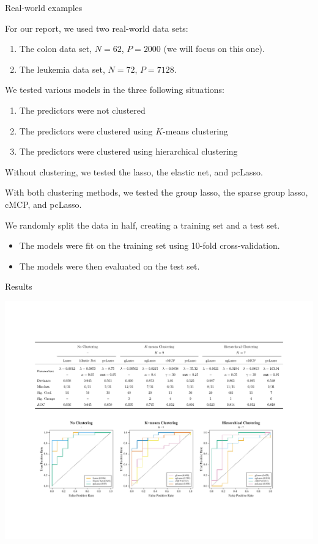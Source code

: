 \documentclass[8pt]{beamer}
\newcommand{\mys}{\vspace{0.5cm} %
}
\begin{document}
\begin{frame}{\color{white} Real-world examples}

For our report, we used two real-world data sets:
\begin{enumerate}
    \item The colon data set, $N = 62$, $P = 2000$ (we will focus on this one).
    \item The leukemia data set, $N = 72$, $P = 7128$.
\end{enumerate} \mys

We tested various models in the three following situations:
\begin{enumerate}
    \item The predictors were not clustered
    \item The predictors were clustered using $K$-means clustering
    \item The predictors were clustered using hierarchical clustering
\end{enumerate} \mys

Without clustering, we tested the lasso, the elastic net, and pcLasso. \mys

With both clustering methods, we tested the group lasso, the sparse group lasso, cMCP, and pcLasso. \mys

We randomly split the data in half, creating a training set and a test set.
\begin{itemize}
    \item The models were fit on the training set using 10-fold cross-validation. 
    \item The models were then evaluated on the test set. 
\end{itemize}
    
\end{frame}

\begin{frame}{Results}

\begin{center}
    \includegraphics[trim = 75 100 75 100, clip, width = \textwidth]{colon_tab.pdf}
\end{center}
    
\end{frame}
\end{document}
